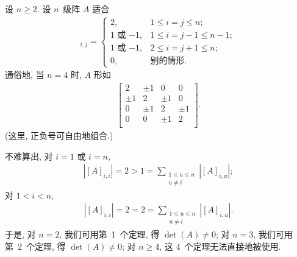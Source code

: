 \documentclass[../libro.tex]{subfiles}
\begin{document}
\begin{example}\label{emp:NonzeroDet3}
    设 \(n \geq 2\).
    设 \(n\)~级阵 \(A\) 适合
    \begin{align*}
        [A]_{i,j} =
        \begin{cases}
            2,
            & 1 \leq i = j \leq n;         \\
            \text{\(1\) 或 \(-1\)},
            & 1 \leq i = j - 1 \leq n - 1; \\
            \text{\(1\) 或 \(-1\)},
            & 2 \leq i = j + 1 \leq n;     \\
            0,
            & \text{别的情形}.
        \end{cases}
    \end{align*}
    通俗地, 当 \(n = 4\) 时, \(A\) 形如
    \begin{align*}
        \begin{bmatrix}
            2     & \pm 1 & 0     & 0     \\
            \pm 1 & 2     & \pm 1 & 0     \\
            0     & \pm 1 & 2     & \pm 1 \\
            0     & 0     & \pm 1 & 2     \\
        \end{bmatrix}.
    \end{align*}
    (这里, 正负号可自由地组合.)

    不难算出, 对 \(i = 1\) 或 \(i = n\),
    \begin{align*}
        |[A]_{i,i}| = 2 > 1
        = \sum_{\substack{1 \leq u \leq n \\ u \neq i}}
        {|[A]_{i,u}|};
    \end{align*}
    对 \(1 < i < n\),
    \begin{align*}
        |[A]_{i,i}| = 2 = 2
        = \sum_{\substack{1 \leq u \leq n \\ u \neq i}}
        {|[A]_{i,u}|}.
    \end{align*}
    于是, 对 \(n = 2\), 我们可用第~1~个定理,
    得 \(\det {(A)} \neq 0\);
    对 \(n = 3\), 我们可用第~2~个定理,
    得 \(\det {(A)} \neq 0\);
    对 \(n \geq 4\), 这 4~个定理无法直接地被使用.


\end{example}
\end{document}
